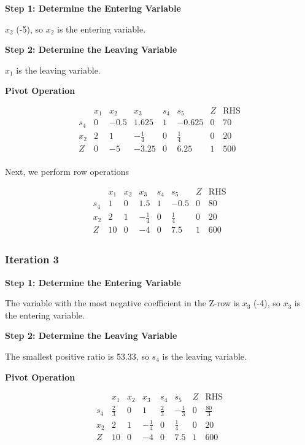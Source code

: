 \documentclass[12pt]{article}
\begin{document}
\textbf{Step 1: Determine the Entering Variable}

 \( x_2 \) (-5), so \( x_2 \) is the entering variable.

\textbf{Step 2: Determine the Leaving Variable}

\( x_1 \) is the leaving variable.

\textbf{Pivot Operation}


\[
\begin{array}{c|cccccc|c}
 & x_1 & x_2 & x_3 & s_4 & s_5 & Z & \text{RHS} \\
\hline
s_4 & 0 & -0.5 & 1.625 & 1 & -0.625 & 0 & 70 \\
x_2 & 2 & 1 & -\frac{1}{4} & 0 & \frac{1}{4} & 0 & 20 \\
\hline
Z & 0 & -5 & -3.25 & 0 & 6.25 & 1 & 500 \\
\end{array}
\]

Next, we perform row operations

\[
\begin{array}{c|cccccc|c}
 & x_1 & x_2 & x_3 & s_4 & s_5 & Z & \text{RHS} \\
\hline
s_4 & 1 & 0 & 1.5 & 1 & -0.5 & 0 & 80 \\
x_2 & 2 & 1 & -\frac{1}{4} & 0 & \frac{1}{4} & 0 & 20 \\
\hline
Z & 10 & 0 & -4 & 0 & 7.5 & 1 & 600 \\
\end{array}
\]

\subsubsection*{Iteration 3}

\textbf{Step 1: Determine the Entering Variable}

The variable with the most negative coefficient in the Z-row is \( x_3 \) (-4), so \( x_3 \) is the entering variable.

\textbf{Step 2: Determine the Leaving Variable}

The smallest positive ratio is 53.33, so \( s_4 \) is the leaving variable.

\textbf{Pivot Operation}


\[
\begin{array}{c|cccccc|c}
 & x_1 & x_2 & x_3 & s_4 & s_5 & Z & \text{RHS} \\
\hline
s_4 & \frac{2}{3} & 0 & 1 & \frac{2}{3} & -\frac{1}{3} & 0 & \frac{80}{3} \\
x_2 & 2 & 1 & -\frac{1}{4} & 0 & \frac{1}{4} & 0 & 20 \\
\hline
Z & 10 & 0 & -4 & 0 & 7.5 & 1 & 600 \\
\end{array}
\]
\end{document}
